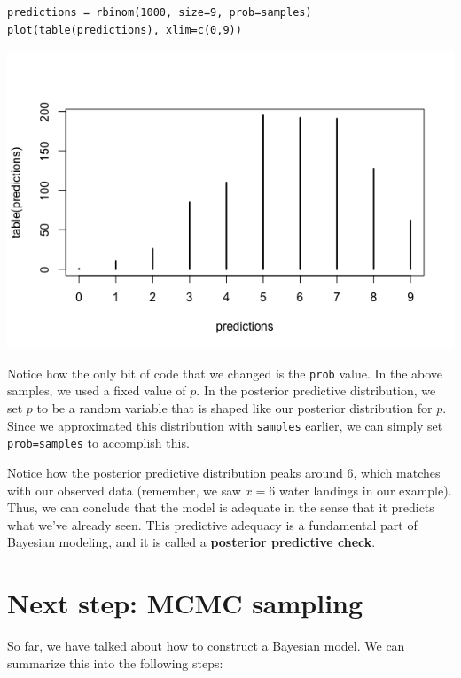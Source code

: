 \documentclass[11pt]{article}
\begin{document}
\begin{verbatim}
predictions = rbinom(1000, size=9, prob=samples)
plot(table(predictions), xlim=c(0,9))
\end{verbatim}

\includegraphics[width=.9\linewidth]{figures/week9/postPredictive.png}

Notice how the only bit of code that we changed is the \texttt{prob} value.  In the above samples, we used a fixed value of $p$.  In the posterior predictive distribution, we set $p$ to be a random variable that is shaped like our posterior distribution for $p$.  Since we approximated this distribution with \texttt{samples} earlier, we can simply set \texttt{prob=samples} to accomplish this.

Notice how the posterior predictive distribution peaks around 6, which matches with our observed data (remember, we saw $x=6$ water landings in our example).  Thus, we can conclude that the model is adequate in the sense that it predicts what we've already seen.  This predictive adequacy is a fundamental part of Bayesian modeling, and it is called a \textbf{posterior predictive check}.

\section*{Next step: MCMC sampling}
\label{sec-2}
So far, we have talked about how to construct a Bayesian model. We can summarize this into the following steps:
\end{document}
